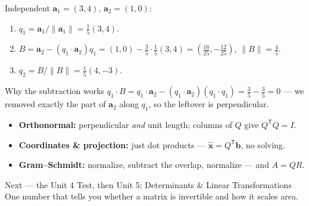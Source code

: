 \documentclass[aspectratio=169, 11pt]{beamer}
\newcommand{\xx}{\mathbf{x}}
\newcommand{\bb}{\mathbf{b}}
\newcommand{\avec}{\mathbf{a}}
\newcommand{\T}{\mathsf{T}}
\begin{document}
\begin{frame}[t, plain]
  Independent $\avec_1=(3,4)$, $\avec_2=(1,0)$:
  \begin{enumerate}
    \setlength{\itemsep}{4pt}
    \item $q_1=\avec_1/\|\avec_1\|=\tfrac15(3,4)$.
    \item $B=\avec_2-(q_1\!\cdot\!\avec_2)q_1=(1,0)-\tfrac35\!\cdot\!\tfrac15(3,4)=\left(\tfrac{16}{25},-\tfrac{12}{25}\right)$,\; $\|B\|=\tfrac45$.
    \item $q_2=B/\|B\|=\tfrac15(4,-3)$.
  \end{enumerate}
  \vspace{2pt}
  \begin{block}{Why the subtraction works}
    $q_1\!\cdot\!B=q_1\!\cdot\!\avec_2-(q_1\!\cdot\!\avec_2)(q_1\!\cdot\!q_1)=\tfrac35-\tfrac35=0$ --- we
    removed exactly the part of $\avec_2$ along $q_1$, so the leftover is perpendicular.
  \end{block}
\end{frame}

\begin{frame}[t, plain]
  \begin{itemize}
    \setlength{\itemsep}{6pt}
    \item \textbf{Orthonormal:} perpendicular \emph{and} unit length; columns of $Q$ give $Q^{\T}Q=I$.
    \item \textbf{Coordinates \& projection:} just dot products --- $\hat{\xx}=Q^{\T}\bb$, no solving.
    \item \textbf{Gram--Schmidt:} normalize, subtract the overlap, normalize --- and $A=QR$.
  \end{itemize}
  \vspace{2pt}
  \begin{block}{Next --- the Unit 4 Test, then Unit 5: Determinants \& Linear Transformations}
    One number that tells you whether a matrix is invertible and how it scales area.
  \end{block}
\end{frame}
\end{document}
